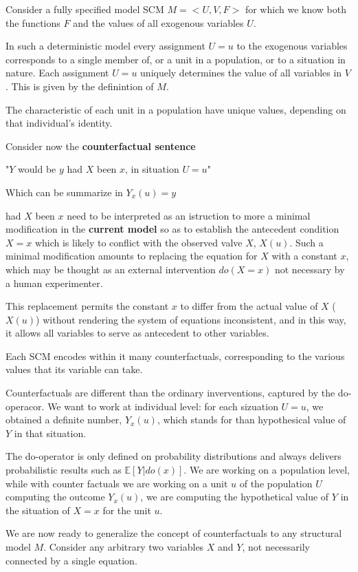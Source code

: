 Consider a fully specified model SCM $M=<U, V,F>$ for which we know both the
functions $F$ and the values of all exogenous variables $U$.

In such a deterministic model every assignment $U=u$ to the exogenous variables
corresponds to a single member of, or a unit in a population, or to a situation in nature.
Each assignment $U=u$ uniquely determines the value of all variables in $V$. This
is given by the definintion of $M$.

The characteristic of each unit in a population have unique values, depending on
that individual's identity.

Consider now the \textbf{counterfactual sentence}
\begin{center}
    "$Y$ would be $y$ had $X$ been $x$, in situation $U=u$"
\end{center}
Which can be summarize in $Y_x(u) = y$


had $X$ been $x$ need to be interpreted as an istruction to more a minimal modification
in the \textbf{current model} so as to establish the antecedent condition $X = x$ which is
likely to conflict with the observed valve $X$, $X(u)$. Such a minimal modification
amounts to replacing the equation for $X$ with a constant $x$, which may be thought
as an external intervention $do(X=x)$ not necessary by a human experimenter.

This replacement permits the constant $x$ to differ from the actual value of $X$ ($X(u)$)
without rendering the system of equations inconsistent, and in this way, it allows
all variables to serve as antecedent to other variables.

Each SCM encodes within it many counterfactuals, corresponding to the various values
that its variable can take.

Counterfactuals are different than the ordinary inverventions, captured by the do-operacor.
We want to work at individual level: for each sizuation $U =u$, we obtained a definite
number, $Y_x (u)$, which stands for than hypothesical value of $Y$ in that situation.

The do-operator is only defined on probability distributions and always delivers
probabilistic results such as $\mathbb{E}[Y| do(x)]$. We are working on a population
level, while with counter factuals we are working on a unit $u$ of the population $U$
computing the outcome $Y_x(u)$, we are computing the hypothetical value of $Y$
in the situation of $X=x$ for the unit $u$.

We are now ready to generalize the concept of counterfactuals to any structural
model $M$. Consider any arbitrary two variables $X$ and $Y$, not necessarily connected
by a single equation.

